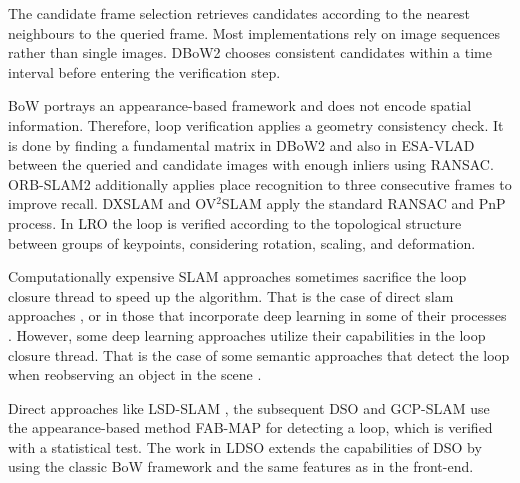 The candidate frame selection retrieves candidates according to the nearest neighbours to the queried frame. 
Most implementations rely on image sequences rather than single images.
DBoW2 \cite{galvez2012dbow2} chooses consistent candidates within a time interval before entering the verification step.

BoW portrays an appearance-based framework and does not encode spatial information. Therefore, loop verification applies a geometry consistency check. It is done by finding a fundamental matrix in DBoW2 \cite{galvez2012dbow2} and also in ESA-VLAD \cite{xu2021esa-vlad} between the queried and candidate images with enough inliers using RANSAC. ORB-SLAM2 \cite{campos2021orb} additionally applies place recognition to three consecutive frames to improve recall. DXSLAM \cite{li2020dxslam} and OV$^2$SLAM \cite{ferrera2021ov2slam} apply the standard RANSAC and PnP process.
In LRO \cite{ma2021loopsuperpoint2} the loop is verified according to the topological structure between groups of keypoints, considering rotation, scaling, and deformation.



Computationally expensive SLAM approaches sometimes sacrifice the loop closure thread to speed up the algorithm. That is the case of direct slam approaches \cite{klein2007dtam,zhang2020vdo,li2021po-slam}, or in those that incorporate deep learning in some of their processes \cite{tateno2017cnnslam,dynaslam18,fan2022blitz-slam}. However, some deep learning approaches utilize their capabilities in the loop closure thread. That is the case of some semantic approaches that detect the loop when reobserving an object in the scene \cite{bavle2020vps-slam,parkhiya2018semanticloopclosure}.

Direct approaches like LSD-SLAM \cite{engel2014lsd}, the subsequent DSO \cite{engel2017dso} and GCP-SLAM \cite{zhang2019gcpslam} use the appearance-based method FAB-MAP \cite{cummins2008fabmap} for detecting a loop, which is verified with a statistical test.  
The work in LDSO \cite{gao2018ldso} extends the capabilities of DSO by using the classic BoW framework and the same features as in the front-end.

